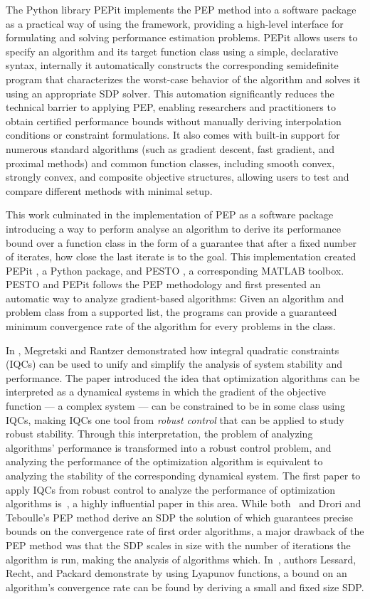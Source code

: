 The Python library PEPit implements the PEP method into a software package as a practical way of using the framework, providing a high-level interface for formulating and solving performance estimation problems. PEPit allows users to specify an algorithm and its target function class using a simple, declarative syntax, internally it automatically constructs the corresponding semidefinite program that characterizes the worst-case behavior of the algorithm and solves it using an appropriate SDP solver. This automation significantly reduces the technical barrier to applying PEP, enabling researchers and practitioners to obtain certified performance bounds without manually deriving interpolation conditions or constraint formulations. It also comes with built-in support for numerous standard algorithms (such as gradient descent, fast gradient, and proximal methods) and common function classes, including smooth convex, strongly convex, and composite objective structures, allowing users to test and compare different methods with minimal setup.

This work culminated in the implementation of PEP as a software package introducing a way to perform analyse an algorithm to derive its performance bound over a function class in the form of a guarantee that after a fixed number of iterates, how close the last iterate is to the goal. This implementation created PEPit \cite{pepit}, a Python package, and PESTO \cite{pesto}, a corresponding MATLAB toolbox. PESTO and PEPit follows the PEP methodology and first presented an automatic way to analyze gradient-based algorithms: Given an algorithm and problem class from a supported list, the programs can provide a guaranteed minimum convergence rate of the algorithm for every problems in the class.

In \cite{iqc}, Megretski and Rantzer demonstrated how integral quadratic constraints (IQCs) can be used to unify and simplify the analysis of system stability and performance. The paper introduced the idea that optimization algorithms can be interpreted as a dynamical systems in which the gradient of the objective function --- a complex system --- can be constrained to be in some class using IQCs, making IQCs one tool from \textit{robust control} that can be applied to study robust stability. Through this interpretation, the problem of analyzing algorithms' performance is transformed into a robust control problem, and analyzing the performance of the optimization algorithm is equivalent to analyzing the stability of the corresponding dynamical system. The first paper to apply IQCs from robust control to analyze the performance of optimization algorithms is~\cite{lessard2016}, a highly influential paper in this area. While both~\cite{lessard2016} and Drori and Teboulle's PEP method derive an SDP the solution of which guarantees precise bounds on the convergence rate of first order algorithms, a major drawback of the PEP method was that the SDP scales in size with the number of iterations the algorithm is run, making the analysis of algorithms which. In~\cite{lessard2016}, authors Lessard, Recht, and Packard demonstrate by using Lyapunov functions, a bound on an algorithm's convergence rate can be found by deriving a small and fixed size SDP.

